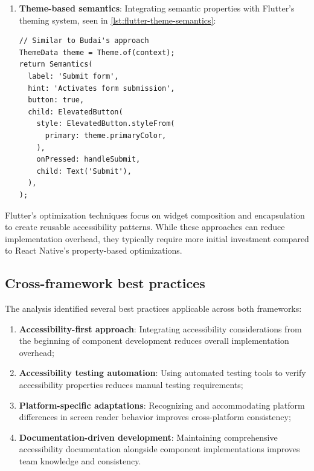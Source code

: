 \begin{enumerate}
\pagebreak
    
    \item \textbf{Theme-based semantics}: Integrating semantic properties with Flutter's theming system, seen in \ref{lst:flutter-theme-semantics}:
    
    \begin{lstlisting}[style=DartStyle, caption=Theme-based semantics in Flutter, label=lst:flutter-theme-semantics]
// Similar to Budai's approach
ThemeData theme = Theme.of(context);
return Semantics(
  label: 'Submit form',
  hint: 'Activates form submission',
  button: true,
  child: ElevatedButton(
    style: ElevatedButton.styleFrom(
      primary: theme.primaryColor,
    ),
    onPressed: handleSubmit,
    child: Text('Submit'),
  ),
);
    \end{lstlisting}
\end{enumerate}

Flutter's optimization techniques focus on widget composition and encapsulation to create reusable accessibility patterns. While these approaches can reduce implementation overhead, they typically require more initial investment compared to React Native's property-based optimizations.

\subsection{Cross-framework best practices}
\label{subsec:cross-framework-practices}

The analysis identified several best practices applicable across both frameworks:

\begin{enumerate}
    \item \textbf{Accessibility-first approach}: Integrating accessibility considerations from the beginning of component development reduces overall implementation overhead;
    
    \item \textbf{Accessibility testing automation}: Using automated testing tools to verify accessibility properties reduces manual testing requirements;
    
    \item \textbf{Platform-specific adaptations}: Recognizing and accommodating platform differences in screen reader behavior improves cross-platform consistency;
    
    \item \textbf{Documentation-driven development}: Maintaining comprehensive accessibility documentation alongside component implementations improves team knowledge and consistency.
\end{enumerate}

